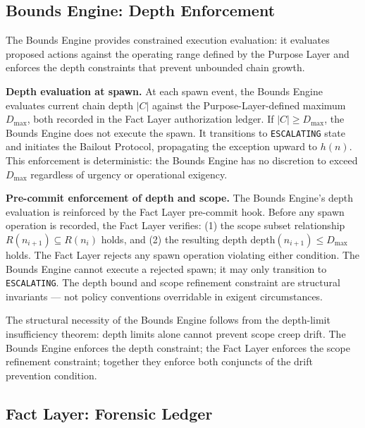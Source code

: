 \subsection{Bounds Engine: Depth Enforcement}
\label{sec:rs-bounds-depth}

The Bounds Engine provides constrained execution evaluation: it evaluates proposed actions against the operating range defined by the Purpose Layer and enforces the depth constraints that prevent unbounded chain growth.

\medskip
\noindent\textbf{Depth evaluation at spawn.} At each spawn event, the Bounds Engine evaluates current chain depth $|C|$ against the Purpose-Layer-defined maximum $D_{\mathrm{max}}$, both recorded in the Fact Layer authorization ledger. If $|C| \geq D_{\mathrm{max}}$, the Bounds Engine does not execute the spawn. It transitions to \texttt{ESCALATING} state and initiates the Bailout Protocol, propagating the exception upward to $h(n)$. This enforcement is deterministic: the Bounds Engine has no discretion to exceed $D_{\mathrm{max}}$ regardless of urgency or operational exigency.

\medskip
\noindent\textbf{Pre-commit enforcement of depth and scope.} The Bounds Engine's depth evaluation is reinforced by the Fact Layer pre-commit hook. Before any spawn operation is recorded, the Fact Layer verifies: (1) the scope subset relationship $R(n_{i+1}) \subseteq R(n_i)$ holds, and (2) the resulting depth $\mathrm{depth}(n_{i+1}) \leq D_{\mathrm{max}}$ holds. The Fact Layer rejects any spawn operation violating either condition. The Bounds Engine cannot execute a rejected spawn; it may only transition to \texttt{ESCALATING}. The depth bound and scope refinement constraint are structural invariants — not policy conventions overridable in exigent circumstances.

The structural necessity of the Bounds Engine follows from the depth-limit insufficiency theorem: depth limits alone cannot prevent scope creep drift. The Bounds Engine enforces the depth constraint; the Fact Layer enforces the scope refinement constraint; together they enforce both conjuncts of the drift prevention condition.

\subsection{Fact Layer: Forensic Ledger}
\label{sec:rs-fact-ledger}

